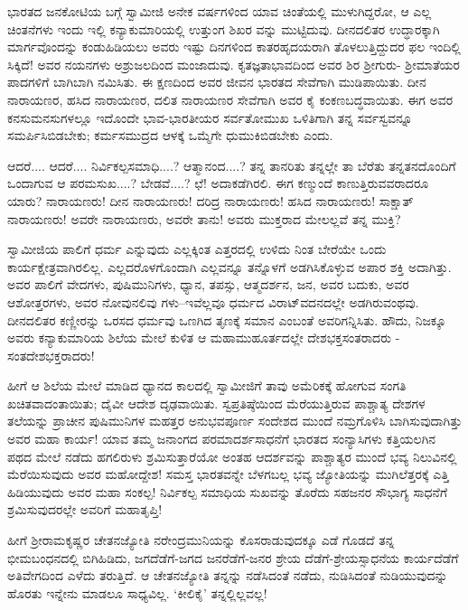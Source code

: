 ಭಾರತದ ಜನಕೋಟಿಯ ಬಗ್ಗೆ ಸ್ವಾಮೀಜಿ ಅನೇಕ ವರ್ಷಗಳಿಂದ ಯಾವ ಚಿಂತೆಯಲ್ಲಿ ಮುಳುಗಿದ್ದರೋ, ಆ ಎಲ್ಲ ಚಿಂತನೆಗಳು ಇಂದು ಇಲ್ಲಿ ಕನ್ಯಾಕುಮಾರಿಯಲ್ಲಿ ಉತ್ತುಂಗ ಶಿಖರ ವನ್ನು ಮುಟ್ಟಿದುವು. ದೀನದಲಿತರ ಉದ್ಧಾರಕ್ಕಾಗಿ ಮಾರ್ಗವೊಂದನ್ನು ಕಂಡುಹಿಡಿಯಲು ಅವರು ಇಷ್ಟು ದಿನಗಳಿಂದ ಕಾತರಹೃದಯರಾಗಿ ತೊಳಲುತ್ತಿದ್ದುದರ ಫಲ ಇಂದಿಲ್ಲಿ ಸಿಕ್ಕಿದೆ! ಅವರ ನಯನಗಳು ಅಶ್ರುಜಲದಿಂದ ಮಂಜಾದುವು. ಕೃತಜ್ಞತಾಭಾವದಿಂದ ಅವರ ಶಿರ ಶ್ರೀಗುರು- ಶ್ರೀಮಾತೆಯರ ಪಾದಗಳಿಗೆ ಬಾಗಿಬಾಗಿ ನಮಿಸಿತು. ಈ ಕ್ಷಣದಿಂದ ಅವರ ಜೀವನ ಭಾರತದ ಸೇವೆಗಾಗಿ ಮುಡಿಪಾಯಿತು. ದೀನ ನಾರಾಯಣರ, ಹಸಿದ ನಾರಾಯಣರ, ದಲಿತ ನಾರಾಯಣರ ಸೇವೆಗಾಗಿ ಅವರ ಕೈ ಕಂಕಣಬದ್ಧವಾಯಿತು. ಈಗ ಅವರ ಕನಸುಮನಸುಗಳಲ್ಲೂ ಇದೊಂದೇ ಭಾವ-ಭಾರತೀಯರ ಸರ್ವತೋಮುಖ ಒಳಿತಿಗಾಗಿ ತನ್ನ ಸರ್ವಸ್ವವನ್ನೂ ಸಮರ್ಪಿಸಿಬಿಡಬೇಕು; ಕರ್ಮಸಮುದ್ರದ ಆಳಕ್ಕೆ ಒಮ್ಮೆಗೇ ಧುಮುಕಿಬಿಡಬೇಕು ಎಂದು.

ಆದರೆ.... ಆದರೆ.... ನಿರ್ವಿಕಲ್ಪಸಮಾಧಿ....? ಆತ್ಮಾನಂದ....? ತನ್ನ ತಾನರಿತು ತನ್ನಲ್ಲೇ ತಾ ಬೆರೆತು ತನ್ನತನದೊಂದಿಗೆ ಒಂದಾಗುವ ಆ ಪರಮಸುಖ....? ಬೇಡವೆ....? ಛೆ! ಅದಾಕಡೆಗಿರಲಿ. ಈಗ ಕಣ್ಮುಂದೆ ಕಾಣುತ್ತಿರುವವರಾದರೂ ಯಾರು? ನಾರಾಯಣರು! ದೀನ ನಾರಾಯಣರು! ದರಿದ್ರ ನಾರಾಯಣರು! ಹಸಿದ ನಾರಾಯಣರು! ಸಾಕ್ಷಾತ್ ನಾರಾಯಣರು! ಅವರೇ ನಾರಾಯಣರು, ಅವರೇ ತಾನು! ಅವರು ಮುಕ್ತರಾದ ಮೇಲಲ್ಲವೆ ತನ್ನ ಮುಕ್ತಿ?

ಸ್ವಾಮೀಜಿಯ ಪಾಲಿಗೆ ಧರ್ಮ ಎನ್ನುವುದು ಎಲ್ಲಕ್ಕಿಂತ ಎತ್ತರದಲ್ಲಿ ಉಳಿದು ನಿಂತ ಬೇರೆಯೇ ಒಂದು ಕಾರ್ಯಕ್ಷೇತ್ರವಾಗಿರಲಿಲ್ಲ. ಎಲ್ಲದರೊಳಗೊಂದಾಗಿ ಎಲ್ಲವನ್ನೂ ತನ್ನೊಳಗೆ ಅಡಗಿಸಿಕೊಳ್ಳುವ ಅಪಾರ ಶಕ್ತಿ ಅದಾಗಿತ್ತು. ಅವರ ಪಾಲಿಗೆ ವೇದಗಳು, ಪುಷಿಮುನಿಗಳು, ಧ್ಯಾನ, ತಪಸ್ಸು, ಆತ್ಮದರ್ಶನ, ಜನ, ಅವರ ಬದುಕು, ಅವರ ಆಶೋತ್ತರಗಳು, ಅವರ ನೋವುನಲಿವು ಗಳು–ಇವೆಲ್ಲವೂ ಧರ್ಮದ ವಿರಾಟ್​ವದನದಲ್ಲೇ ಅಡಗಿರುವಂಥವು. ದೀನದಲಿತರ ಕಣ್ಣೀರನ್ನು ಒರಸದ ಧರ್ಮವು ಒಣಗಿದ ತೃಣಕ್ಕೆ ಸಮಾನ ಎಂಬಂತೆ ಅವರಿಗನ್ನಿಸಿತು. ಹೌದು, ನಿಜಕ್ಕೂ ಅವರು ಕನ್ಯಾಕುಮಾರಿಯ ಶಿಲೆಯ ಮೇಲೆ ಕುಳಿತ ಆ ಮಹಾಮುಹೂರ್ತದಲ್ಲೇ ದೇಶಭಕ್ತಸಂತರಾದರು - ಸಂತದೇಶಭಕ್ತರಾದರು!

ಹೀಗೆ ಆ ಶಿಲೆಯ ಮೇಲೆ ಮಾಡಿದ ಧ್ಯಾನದ ಕಾಲದಲ್ಲಿ ಸ್ವಾಮೀಜಿಗೆ ತಾವು ಅಮೆರಿಕಕ್ಕೆ ಹೋಗುವ ಸಂಗತಿ ಖಚಿತವಾದಂತಾಯಿತು; ದೈವೀ ಆದೇಶ ದೃಢವಾಯಿತು. ಸ್ವಪ್ರತಿಷ್ಠೆಯಿಂದ ಮೆರೆಯುತ್ತಿರುವ ಪಾಶ್ಚಾತ್ಯ ದೇಶಗಳ ತಲೆಯನ್ನು ಪ್ರಾಚೀನ ಪುಷಿಮುನಿಗಳ ಮಹತ್ತರ ಅನುಭವಪೂರ್ಣ ಸಂದೇಶದ ಮುಂದೆ ನಮ್ರಗೊಳಿಸಿ ಬಾಗಿಸುವುದಾಗಿತ್ತು ಅವರ ಮಹಾ ಕಾರ್ಯ! ಯಾವ ತಮ್ಮ ಜನಾಂಗದ ಪರಮಾದರ್ಶಸಾಧನೆಗೆ ಭಾರತದ ಸಂನ್ಯಾಸಿಗಳು ಕತ್ತಿಯಲಗಿನ ಪಥದ ಮೇಲೆ ನಡೆದು ಹಗಲಿರುಳು ಶ್ರಮಿಸುತ್ತಾರೆಯೋ ಅಂತಹ ಆದರ್ಶವನ್ನು ಪಾಶ್ಚಾತ್ಯರ ಮುಂದೆ ಭವ್ಯ ನಿಲುವಿನಲ್ಲಿ ಮೆರೆಯಿಸುವುದು ಅವರ ಮಹೋದ್ದೇಶ! ಸಮಸ್ತ ಭಾರತವನ್ನೇ ಬೆಳಗಬಲ್ಲ ಭವ್ಯ ಜ್ಯೋತಿಯನ್ನು ಮುಗಿಲೆತ್ತರಕ್ಕೆ ಎತ್ತಿ ಹಿಡಿಯುವುದು ಅವರ ಮಹಾ ಸಂಕಲ್ಪ! ನಿರ್ವಿಕಲ್ಪ ಸಮಾಧಿಯ ಸುಖವನ್ನು ತೊರೆದು ಸಹಜನರ ಸೌಭಾಗ್ಯ ಸಾಧನೆಗೆ ಶ್ರಮಿಸುವುದರಲ್ಲೇ ಅವರಿಗೆ ಮಹಾತೃಪ್ತಿ!

ಹೀಗೆ ಶ್ರೀರಾಮಕೃಷ್ಣರ ಚೇತನಜ್ಯೋತಿ ನರೇಂದ್ರಮುನಿಯನ್ನು ಕೊಸರಾಡುವುದಕ್ಕೂ ಎಡೆ ಗೊಡದೆ ತನ್ನ ಭೀಮಬಂಧನದಲ್ಲಿ ಬಿಗಿಹಿಡಿದು, ಜಗದೆಡೆಗೆ-ಜಗದ ಜನರೆಡೆಗೆ-ಜನರ ಶ್ರೇಯ ದೆಡೆಗೆ-ಶ್ರೇಯಸ್ಸಾಧನೆಯ ಕಾರ್ಯದೆಡೆಗೆ ಅತಿವೇಗದಿಂದ ಎಳೆದು ತರುತ್ತಿದೆ. ಆ ಚೇತನಜ್ಯೋತಿ ತನ್ನನ್ನು ನಡೆಸಿದಂತೆ ನಡೆದು, ನುಡಿಸಿದಂತೆ ನುಡಿಯುವುದನ್ನು ಹೊರತು ಇನ್ನೇನು ಮಾಡಲೂ ಸಾಧ್ಯವಿಲ್ಲ. ‘ಕೀಲಿಕೈ’ ತನ್ನಲ್ಲಿಲ್ಲವಲ್ಲ!

